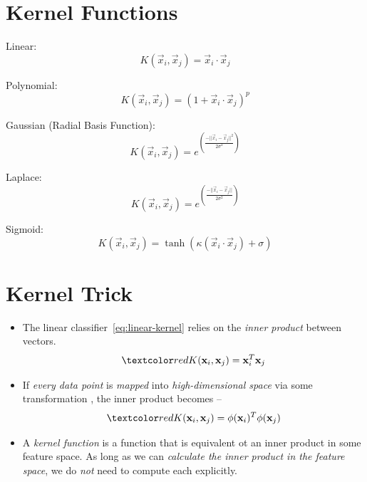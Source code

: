 \documentclass[
	number={2},
	title={Learning Linear Separators{,} SVMs and Kernels}
]{cs584notes}
\begin{document}
\section{Kernel Functions}\label{sec:kernel-functions}
Linear:
\begin{equation}
	K(\vec{x}_{i}, \vec{x}_{j}) = \vec{x}_{i} \cdot \vec{x}_{j}
	\label{eq:linear-kernel}
\end{equation}

Polynomial:
\begin{equation}
	K(\vec{x}_{i}, \vec{x}_{j}) = \left(1 + \vec{x}_{i} \cdot \vec{x}_{j} \right)^{p}
	\label{eq:polynomial-kernel}
\end{equation}

Gaussian (Radial Basis Function):
\begin{equation}
	K(\vec{x}_{i}, \vec{x}_{j}) = e^{\left( \frac{-|| \vec{x}_{i} - \vec{x}_{j} ||^{2}}{2\sigma^{2}} \right)}
	\label{eq:gaussian-kernel}
\end{equation}

Laplace:
\begin{equation}
	K(\vec{x}_{i}, \vec{x}_{j}) = e^{\left( \frac{-|| \vec{x}_{i} - \vec{x}_{j} ||}{2\sigma^{2}} \right)}
	\label{eq:laplace-kernel}
\end{equation}

Sigmoid:
\begin{equation}
	K(\vec{x}_{i}, \vec{x}_{j}) = \tanh\left( \kappa (\vec{x}_{i} \cdot \vec{x}_{j}) + \sigma \right)
	\label{eq:sigmoid-kernel}
\end{equation}

\section{Kernel Trick}\label{sec:kernel-trick}
\begin{itemize}
	\item The linear classifier~\eqref{eq:linear-kernel} relies on the \emph{inner product} between vectors.
	\[ \data{ K(\vec{x}_{i}, \vec{x}_{j}) = \vec{x}_{i}^{T}\vec{x}_{j} } \]
	\item If \emph{every data point} is \emph{mapped} into \emph{high-dimensional space} via some transformation , the inner product becomes --
	\[ \data{ K(\vec{x}_{i}, \vec{x}_{j}) = \phi(\vec{x}_{i})^{T}\phi(\vec{x}_{j}) } \]
	\item A \emph{kernel function} is a function that is equivalent ot an inner product in some feature space.
	As long as we can \emph{calculate the inner product in the feature space}, we do \emph{not} need to compute each  explicitly.
\end{itemize}
\end{document}
